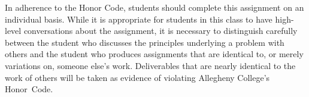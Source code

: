 \vspace*{-.1in} 

In adherence to the Honor Code, students should complete this assignment on an individual basis. While it is appropriate
for students in this class to have high-level conversations about the assignment, it is necessary to distinguish
carefully between the student who discusses the principles underlying a problem with others and the student who produces
assignments that are identical to, or merely variations on, someone else's work.  Deliverables that are nearly identical
to the work of others will be taken as evidence of violating Allegheny College's \mbox{Honor Code}.






